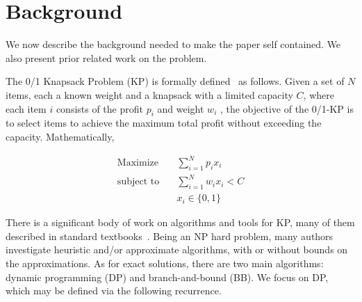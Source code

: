 \chapter{Background}
\label{chap:background}
We now describe the background needed to make the paper self contained.  We
also present prior related work on the problem.


The 0/1 Knapsack Problem (KP) is formally
defined~\cite{Kellerer-etal-KP-book-2004} as follows.  Given a set of $N$
items, each  a known weight and a knapsack with a limited capacity $C$,
where each item $i$ consists of the profit $p_i$ and weight $w_i$ , the
objective of the 0/1-KP is to select items to achieve the maximum total profit
without exceeding the capacity.  Mathematically,

\begin{equation}
  \begin{array}{ll}
 \text{Maximize} & \quad {\displaystyle\sum^N_{i=1} p_i x_i} \\[5mm]
\text{subject to}& \quad {\displaystyle\sum^N_{i=1} w_i x_i < C} \\
 & \quad x_i \in \{0,1\}
  \end{array}
\end{equation}



There is a significant body of work on algorithms and tools for KP, many of
them described in standard textbooks~\cite{MT90, Hu-IPNF-book-1969,
  Kellerer-etal-KP-book-2004, Cormen-etal-Algorithms-2009}.  Being an NP hard
problem, many authors investigate heuristic and/or approximate algorithms,
with or without bounds on the approximations.  As for exact solutions, there
are two main algorithms: dynamic programming (DP) and branch-and-bound (BB).
We focus on DP, which may be defined via the following recurrence.

